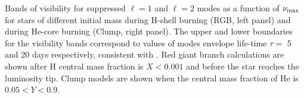 \label{fig:visibility} Bands of visibility for suppressed $\ell=1$ and $\ell=2$ modes as a function of $\nu_{\rm max}$ for stars of different initial mass during H-shell burning (RGB, left panel) and during He-core burning (Clump, right panel). The upper and lower boundaries for the visibility bands correspond to values of modes envelope life-time $\tau=$ 5 and 20 days respectively, consistent with \cite{Dupret_2009,Corsaro_2015}. Red giant branch calculations are shown after H central mass fraction is $ X < 0.001$ and before the star reaches the luminosity tip. Clump models are shown when the central mass fraction of He is $0.05 < Y < 0.9$.

  
  
  
  
  